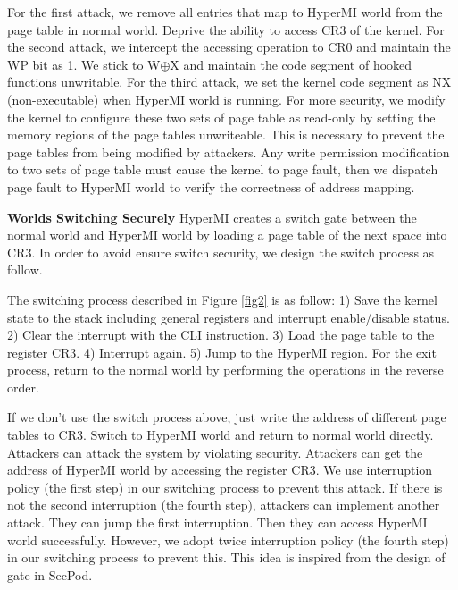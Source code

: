 \documentclass[conference]{IEEEtran}
\begin{document}
For the first attack, %
we remove all entries that map to HyperMI world from the page table in normal world. Deprive the ability to access CR3 of the kernel.%
For the second attack, we intercept the accessing operation to CR0 and maintain the WP bit as 1. We stick to W$\oplus${X} and maintain the code segment of hooked functions unwritable.
For the third attack, we set the kernel code segment as NX (non-executable) when HyperMI world is running. For more security, we modify the kernel to configure these two sets of page table as read-only by setting the memory regions of the page tables unwriteable. This is necessary to prevent the page tables from being modified by attackers. Any write permission modification to two sets of page table must cause the kernel to page fault, then we dispatch page fault to HyperMI world to verify the correctness of address mapping. 


\textbf{Worlds Switching Securely}
HyperMI creates a switch gate between the normal world and HyperMI world by loading a page table of the next space into CR3.
In order to avoid ensure switch security, we design the switch process as follow.

The switching process described in Figure \ref{fig2} is as follow: 1) Save the kernel state to the stack including general registers and interrupt enable/disable status. 2) Clear the interrupt with the CLI instruction. 3) Load the page table to the register CR3. 4) Interrupt again. 5) Jump to the HyperMI region. For the exit process, return to the normal world by performing the operations in the reverse order.

\iffalse
If we don't use the switch process above, just write the address of different page tables to CR3. Switch to HyperMI world and return to normal world directly. Attackers can attack the system by violating security. Attackers can get the address of HyperMI world by accessing the register CR3. We use interruption policy (the first step) in our switching process to prevent this attack. 
If there is not the second interruption (the fourth step), attackers can implement another attack. They can jump the first interruption.
Then they can access HyperMI world successfully. 
However, we adopt twice interruption policy (the fourth step) in our switching process to prevent this. 
This idea is inspired from the design of gate in SecPod\cite{Wang2015SecPod}.
\end{document}
